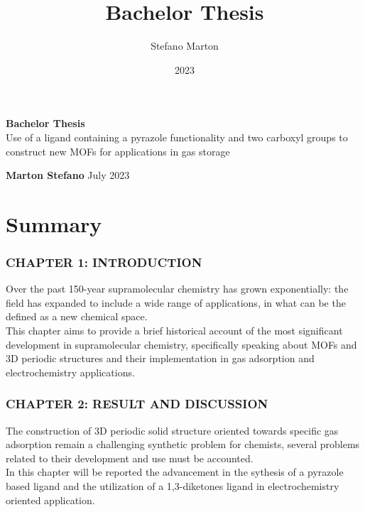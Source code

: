 \documentclass[a4,11pt]{report}
\title{Bachelor Thesis}
\author{Stefano Marton}
\date{2023}
\begin{document}
\begin{titlepage}
	\begin{center}
		\vspace*{6cm}
		\Huge
		\textbf{Bachelor Thesis}\\
		\vspace{0.5cm}
		\LARGE
		\vspace{1.5cm}
		Use of a ligand containing a pyrazole functionality and two carboxyl groups to construct new MOFs for applications in gas storage

		\vspace{1.5cm}
		\textbf{Marton Stefano}
		\vfill
		July 2023
		\vspace{0.8cm}
	\end{center}
\end{titlepage}
\vspace{1cm}

\chapter*{Summary}

\subsection*{CHAPTER 1: INTRODUCTION}

Over the past 150-year supramolecular chemistry has grown exponentially: the field has expanded to include a wide range of applications, in what can be the defined as a new chemical space.\\
This chapter aims to provide a brief historical account of the most significant development in supramolecular chemistry, specifically speaking about MOFs and 3D periodic structures and their implementation in gas adsorption and electrochemistry applications.

\newline\subsection*{CHAPTER 2: RESULT AND DISCUSSION}

The construction of 3D periodic solid structure oriented towards specific gas adsorption remain a challenging synthetic problem for chemists, several problems related to their development and use must be accounted.\\
In this chapter will be reported the advancement in the sythesis of a pyrazole based ligand and the utilization of a 1,3-diketones ligand in electrochemistry oriented application.
\end{document}
